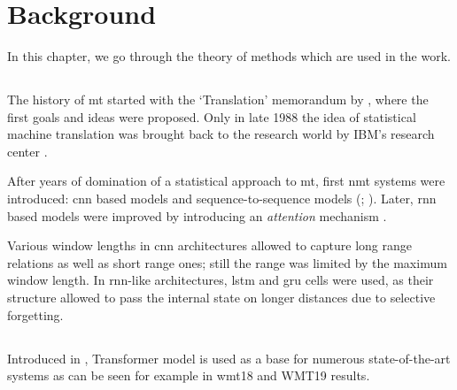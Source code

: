\chapter{Background}

In this chapter, we go through the theory of methods which are used in the work.

\section{}

The history of \acrfull{mt} started with the `Translation' memorandum
by \citet{Weaver1955}, where the first goals and ideas were proposed.
Only in late 1988 the idea of statistical machine translation was 
brought back to the research world by IBM's research center \citet{stat-mt}.

After years of domination of a statistical approach to \acrshort{mt},
first \acrfull{nmt} systems were introduced:
\acrfull{cnn} based models \citep{kalchbrenner-blunsom-2013-recurrent} and
sequence-to-sequence models (; ).
Later, \acrfull{rnn} based models were improved by introducing an
\emph{attention} mechanism \citep{Bahdanau2014-attention}.

Various window lengths in \acrshort{cnn} architectures allowed to capture
long range relations as well as short range ones;
still the range was limited by the maximum window length.
In \acrshort{rnn}-like architectures, \acrfull{lstm} and \acrfull{gru} cells
were used, as their structure allowed to pass the internal state
on longer distances due to selective forgetting.

\section{}

Introduced in , Transformer model is used as a base
for numerous state-of-the-art systems as can be seen for example in 
\acrshort{wmt}18  and
WMT19  results.

